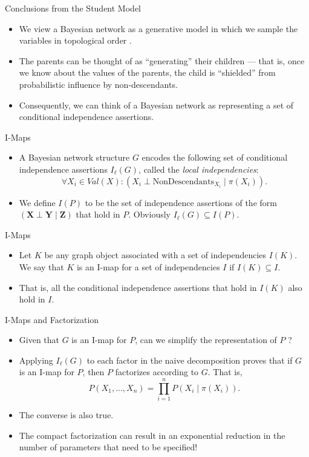 \documentclass[11pt]{beamer}
\begin{document}
\begin{frame}{Conclusions from the Student Model}
\begin{itemize}
	\item We view a Bayesian network as a generative model in which we
	sample the variables in topological order \cite{pgmslides}.
	\item The parents can be thought of as ``generating'' their children ---
	that is, once we know about the values of the parents, the child is
	``shielded'' from probabilistic influence by non-descendants.
	\item Consequently, we can think of a Bayesian network as representing a
	set of conditional independence assertions.
\end{itemize}
\end{frame}

\begin{frame}{I-Maps}
\begin{itemize}
	\item A Bayesian network structure $G$ encodes the following set of
	conditional independence assertions $I_{\ell}(G)$, called the
	\emph{local independencies}:
	\[
		\forall X_{i} \in Val(X): (X_{i} \perp
		\text{NonDescendants}_{X_{i}} \;|\; \pi(X_{i})).
	\]
	\item We define $I(P)$ to be the set of independence assertions of the
	form $(\boldsymbol{X} \perp \boldsymbol{Y} \;|\; \boldsymbol{Z})$ that
	hold in $P$. Obviously $I_{\ell}(G) \subseteq I(P)$.
\end{itemize}
\end{frame}

\begin{frame}{I-Maps}
\begin{itemize}
	\item Let $K$ be any graph object associated with a set of
	independencies $I(K)$. We say that $K$ is an I-map for a set of
	independencies $I$ if $I(K) \subseteq I$.
	\item That is, all the conditional independence assertions that hold in
	$I(K)$ also hold in $I$.
\end{itemize}
\end{frame}

\begin{frame}{I-Maps and Factorization}
\begin{itemize}
	\item Given that $G$ is an I-map for $P$, can we simplify the
	representation of $P$ \cite{nirslides}?
	\item Applying $I_{\ell}(G)$ to each factor in the naive decomposition
	proves that if $G$ is an I-map for $P$, then $P$ factorizes according to
	$G$. That is,
	\[
		P(X_{1}, \ldots, X_{n}) = \prod_{i=1}^{n} P(X_{i} \;|\; \pi(X_{i})).
	\]
	\item The converse is also true.
	\item The compact factorization can result in an exponential reduction
	in the number of parameters that need to be specified!
\end{itemize}
\end{frame}
\end{document}
